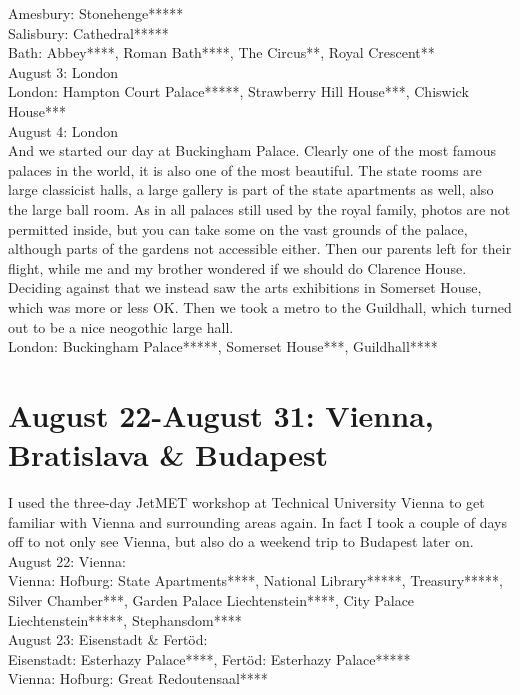 Amesbury: Stonehenge*****\\
Salisbury: Cathedral*****\\
Bath: Abbey****, Roman Bath****, The Circus**, Royal Crescent**\\

August 3: London\\
London: Hampton Court Palace*****, Strawberry Hill House***, Chiswick House***\\

August 4: London\\
And we started our day at Buckingham Palace. Clearly one of the most famous palaces in the world, it is also one of the most beautiful. The state rooms are large classicist halls, a large gallery is part of the state apartments as well, also the large ball room. As in all palaces still used by the royal family, photos are not permitted inside, but you can take some on the vast grounds of the palace, although parts of the gardens not accessible either. Then our parents left for their flight, while me and my brother wondered if we should do Clarence House. Deciding against that we instead saw the arts exhibitions in Somerset House, which was more or less OK. Then we took a metro to the Guildhall, which turned out to be a nice neogothic large hall.\\

London: Buckingham Palace*****, Somerset House***, Guildhall****\\

\section{August 22-August 31: Vienna, Bratislava \& Budapest}
\label{austria2014}

I used the three-day JetMET workshop at Technical University Vienna to get familiar with Vienna and surrounding areas again. In fact I took a couple of days off to not only see Vienna, but also do a weekend trip to Budapest later on.\\ 

August 22: Vienna:\\
Vienna: Hofburg: State Apartments****, National Library*****, Treasury*****, Silver Chamber***, Garden Palace Liechtenstein****, City Palace Liechtenstein*****, Stephansdom****\\

August 23: Eisenstadt \& Fert\"od:\\
Eisenstadt: Esterhazy Palace****, Fert\"od: Esterhazy Palace*****\\
Vienna: Hofburg: Great Redoutensaal****\\

